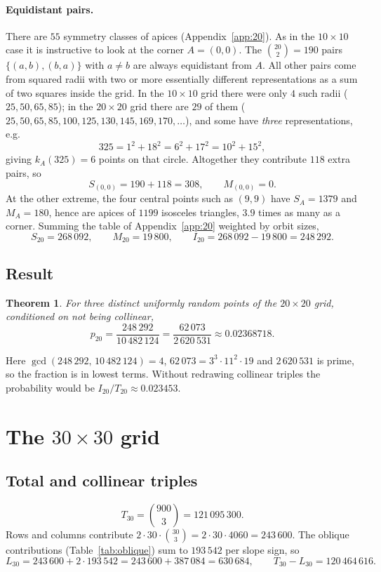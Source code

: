 \documentclass[11pt,a4paper]{article}
\newtheorem*{theorem*}{Theorem}
\theoremstyle{remark}
\begin{document}
\paragraph{Equidistant pairs.} There are $55$ symmetry classes of apices
(Appendix~\ref{app:20}). As in the $10\times10$ case it is instructive to look at
the corner $A=(0,0)$. The $\binom{20}{2}=190$ pairs $\{(a,b),(b,a)\}$ with $a\ne b$
are always equidistant from $A$. All other pairs come from squared radii with
two or more essentially different representations as a sum of two squares
inside the grid. In the $10\times10$ grid there were only $4$ such radii
($25,50,65,85$); in the $20\times20$ grid there are $29$ of them
($25,50,65,85,100,125,130,145,169,170,\dots$), and some have \emph{three}
representations, e.g.
\[
  325=1^2+18^2=6^2+17^2=10^2+15^2,
\]
giving $k_A(325)=6$ points on that circle. Altogether they contribute $118$ extra
pairs, so
\[
  S_{(0,0)}=190+118=308,\qquad M_{(0,0)}=0.
\]
At the other extreme, the four central points such as $(9,9)$ have
$S_A=1379$ and $M_A=180$, hence are apices of $1199$ isosceles triangles,
$3.9$ times as many as a corner. Summing the table of Appendix~\ref{app:20}
weighted by orbit sizes,
\[
  S_{20}=268\,092,\qquad M_{20}=19\,800,\qquad
  I_{20}=268\,092-19\,800=248\,292 .
\]

\subsection{Result}
\begin{theorem*}
For three distinct uniformly random points of the $20\times20$ grid, conditioned
on not being collinear,
\[
  p_{20}=\frac{248\,292}{10\,482\,124}=\frac{62\,073}{2\,620\,531}\approx0.02368718 .
\]
\end{theorem*}
Here $\gcd(248\,292,\,10\,482\,124)=4$, $62\,073=3^3\cdot11^2\cdot19$ and
$2\,620\,531$ is prime, so the fraction is in lowest terms. Without redrawing
collinear triples the probability would be $I_{20}/T_{20}\approx0.023453$.

\section{The $30\times30$ grid}

\subsection{Total and collinear triples}
\[
  T_{30}=\binom{900}{3}=121\,095\,300.
\]
Rows and columns contribute $2\cdot30\cdot\binom{30}{3}=2\cdot30\cdot4060=243\,600$.
The oblique contributions (Table~\ref{tab:oblique}) sum to $193\,542$ per slope
sign, so
\[
  L_{30}=243\,600+2\cdot193\,542=243\,600+387\,084=630\,684,
  \qquad
  T_{30}-L_{30}=120\,464\,616 .
\]
\end{document}
